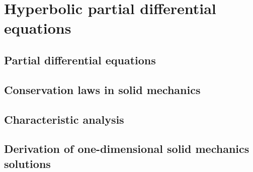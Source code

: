 \chapter{Hyperbolic partial differential equations}
\newpage
\section{Partial differential equations}
\label{sec:PDEs}


\section{Conservation laws in solid mechanics}
\label{sec:solidMech_equations}
%


\section{Characteristic analysis}
\label{sec:characteristic_analysis}
%


\section{Derivation of one-dimensional solid mechanics solutions}
\label{sec:analytical_results}
%




